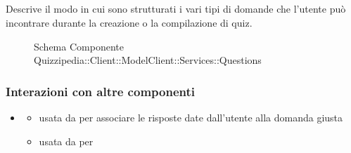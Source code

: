 \subsection{}
Descrive il modo in cui sono strutturati i vari tipi di domande che l'utente può incontrare durante la creazione o la compilazione di quiz.
\begin{figure}[H]
\centering
\noindent{}
\caption[Schema Componente Quizzipedia::Client::ModelClient::Services::Questions]{Schema Componente Quizzipedia::Client::ModelClient::Services::Questions}
\end{figure}
\subsubsection{Interazioni con altre componenti}
\begin{itemize}
\item {}
\begin{itemize}
\item usata da  per associare le risposte date dall'utente alla domanda giusta
\item usata da  per 
\end{itemize}
\end{itemize}
